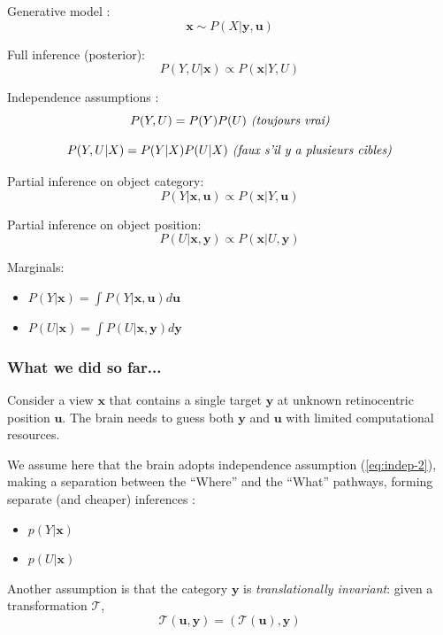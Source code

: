 Generative model :
$$ \boldsymbol{x} \sim P(X|\boldsymbol{y}, \boldsymbol{u}) $$

Full inference (posterior):
$$ P(Y, U|\boldsymbol{x}) \propto  P(\boldsymbol{x}|Y, U) $$

Independence assumptions :
\begin{equation} 
P(Y, U) = P(Y)  P(U) \text{\emph{ (toujours vrai)}}
\label{eq:indep-1}
\end{equation}

\begin{equation}  
P(Y, U|X) = P(Y|X)  P(U|X) \text{\emph{ (faux s'il y a plusieurs cibles)}}
\label{eq:indep-2}
\end{equation}

Partial inference on object category:
$$ P(Y|\boldsymbol{x}, \boldsymbol{u}) \propto  P(\boldsymbol{x}|Y, \boldsymbol{u}) $$

Partial inference on object position:
$$ P(U|\boldsymbol{x}, \boldsymbol{y}) \propto  P(\boldsymbol{x}|U, \boldsymbol{y}) $$

Marginals:
\begin{itemize}
\item $ P(Y|\boldsymbol{x}) = \int P(Y|\boldsymbol{x}, \boldsymbol{u}) d\boldsymbol{u}$
\item $ P(U|\boldsymbol{x}) = \int P(U|\boldsymbol{x}, \boldsymbol{y}) d\boldsymbol{y}$
\end{itemize}

\subsubsection{What we did so far...}

Consider a view $\boldsymbol{x}$ that contains a single target $\boldsymbol{y}$ at unknown retinocentric position $\boldsymbol{u}$. The brain needs to guess both  $\boldsymbol{y}$ and $\boldsymbol{u}$ with limited computational resources. 
   
We assume here that the brain adopts independence assumption (\ref{eq:indep-2}), making a separation between the ``Where'' and the ``What'' pathways, forming separate (and cheaper) inferences :
\begin{itemize}
\item $p(Y|\boldsymbol{x})$
\item $p(U|\boldsymbol{x})$
\end{itemize}

Another assumption is that the category $\boldsymbol{y}$ is \emph{translationally invariant}: given a transformation $\mathcal{T}$,
$$\mathcal{T}(\boldsymbol{u}, \boldsymbol{y}) 
= (\mathcal{T}(\boldsymbol{u}), \boldsymbol{y})$$

